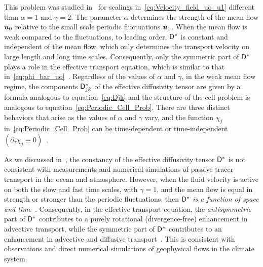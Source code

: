 \documentclass[amsa]{ipart}
\begin{document}
This problem was studied in~\cite{Pavliotis:PHD_Thesis} for 
scalings in~\eqref{eq:Velocity_field_uo_u1} different than $\alpha=1$ and
$\gamma=2$. The parameter $\alpha$ determines the strength of the mean flow $\boldsymbol{u}_0$
relative to the small scale periodic fluctuations $\boldsymbol{u}_1$. When the
mean flow is weak compared to the fluctuations, to leading order,
$\mathsf{D}^*$ is constant and independent of the mean flow, which only
determines the transport velocity on large length and long time
scales. Consequently, only the symmetric part of $\mathsf{D}^*$ plays a role
in the effective transport equation, which is similar to that
in~\eqref{eq:phi_bar_uo}~\cite{Pavliotis:PHD_Thesis}. Regardless of
the values of $\alpha$ and $\gamma$, in the weak mean flow regime, the
components $\mathsf{D}^*_{jk}$ of the effective diffusivity tensor are given
by a formula analogous to equation~\eqref{eq:Djk} and the structure of
the cell problem is analogous to
equation~\eqref{eq:Periodic_Cell_Prob}. There are three distinct
behaviors that arise as the values of $\alpha$ and $\gamma$ vary, and the
function $\chi_j$ in~\eqref{eq:Periodic_Cell_Prob} can be time-dependent
or time-independent $(\partial_\tau\chi_j\equiv0)$~\cite{Pavliotis:PHD_Thesis}.



As we discussed in~, the constancy of the
effective diffusivity tensor $\mathsf{D}^*$ is not consistent with
measurements and numerical simulations of passive tracer transport in
the ocean and atmosphere. However, when the fluid velocity is active
on both the slow and fast time scales, with $\gamma=1$, and the mean flow
is equal in strength or stronger than the periodic fluctuations, then
$\mathsf{D}^*$ \emph{ is a function of space and
  time}~\cite{Pavliotis:PHD_Thesis}. Consequently, in the effective  
transport equation, the \emph{antisymmetric} part of $\mathsf{D}^*$ contributes to a
purely rotational (divergence-free) enhancement in advective
transport, while the symmetric part of $\mathsf{D}^*$ contributes to an
enhancement in advective and diffusive
transport~\cite{Pavliotis:PHD_Thesis}. This is consistent with
observations and direct numerical simulations of geophysical flows in
the climate system. 
\end{document}
